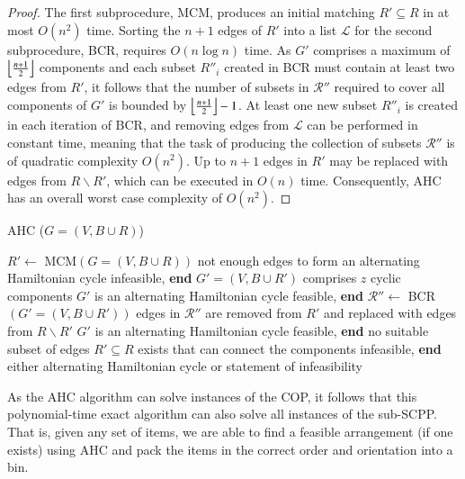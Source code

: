 \documentclass[a4paper,11pt,authoryear]{elsarticle}
\DeclarePairedDelimiter{\floor}{\lfloor}{\rfloor}
\begin{document}
\begin{proof}
	The first subprocedure, MCM, produces an initial matching $R' \subseteq R$ in at most $O(n^2)$ time. Sorting the $n+1$ edges of $R'$ into a list $\mathcal{L}$ for the second subprocedure, BCR, requires $O(n\log n)$ time. As $G'$ comprises a maximum of $\floor*{\frac{n+1}{2}}$ components and each subset $R''_i$ created in BCR must contain at least two edges from $R'$, it follows that the number of subsets in $\mathcal{R}''$ required to cover all components of $G'$ is bounded by $\floor*{\frac{n+1}{2}}-1$. At least one new subset $R''_i$ is created in each iteration of BCR, and removing edges from $\mathcal{L}$ can be performed in constant time, meaning that the task of producing the collection of subsets $\mathcal{R}''$ is of quadratic complexity $O(n^2)$. Up to $n+1$ edges in $R'$ may be replaced with edges from $R \backslash R'$, which can be executed in $O(n)$ time. Consequently, AHC has an overall worst case complexity of $O(n^2)$. 
\end{proof}	

\begin{algorithm}[h]
\caption{AHC ($G = (V, B \cup R)$)}
\small
\begin{algorithmic}[1]
	\State $R' \gets$ MCM$(G = (V, B \cup R))$
		\State not enough edges to form an alternating Hamiltonian cycle
		\State infeasible, \textbf{end}
	\EndIf
	\State $G'=(V, B \cup R')$ comprises $z$ cyclic components
		\State $G'$ is an alternating Hamiltonian cycle
		\State feasible, \textbf{end}
	\EndIf
	\State $\mathcal{R}'' \gets$ BCR$(G'=(V, B \cup R'))$
		\State edges in $\mathcal{R}''$ are removed from $R'$ and replaced with edges from $R\backslash R'$
		\State $G'$ is an alternating Hamiltonian cycle
		\State feasible, \textbf{end}
	\Else
		\State no suitable subset of edges $R' \subseteq R$ exists that can connect the components
		\State infeasible, \textbf{end}
	\EndIf
	\Return either alternating Hamiltonian cycle or statement of infeasibility
\end{algorithmic}
\label{alg:ahc}	
\end{algorithm}

\noindent As the AHC algorithm can solve instances of the COP, it follows that this polynomial-time exact algorithm can also solve all instances of the sub-SCPP. That is, given any set of items, we are able to find a feasible arrangement (if one exists) using AHC and pack the items in the correct order and orientation into a bin.
\end{document}
